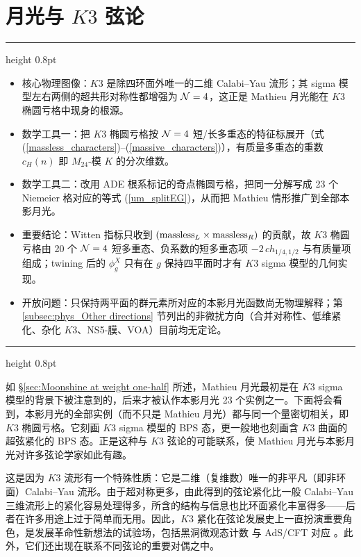 \documentclass[11pt,a4paper,fontset=windows]{ctexart}
\numberwithin{equation}{section}
\newenvironment{keytakeaways}
  {\par\medskip\noindent
   \begin{minipage}{\linewidth}
   \hrule height 0.8pt\smallskip
   \noindent{\bfseries 本节重点（Key Takeaways）}\par\smallskip
   \begin{itemize}[leftmargin=1.6em,itemsep=2pt,topsep=1pt,parsep=0pt,partopsep=0pt]}
  {\end{itemize}\smallskip\hrule height 0.8pt\end{minipage}%
   \par\medskip}
\newcommand{\eq}[1]{(\ref{#1})}
\begin{document}
\section{月光与 $K3$ 弦论}
\label{chap:moonshineK3}

\begin{keytakeaways}
  \item 核心物理图像：$K3$ 是除四环面外唯一的二维 Calabi--Yau 流形；其 sigma 模型左右两侧的超共形对称性都增强为 ${\cal N}=4$，这正是 Mathieu 月光能在 $K3$ 椭圆亏格中现身的根源。
  \item 数学工具一：把 $K3$ 椭圆亏格按 ${\cal N}=4$ 短/长多重态的特征标展开（式 \eq{massless_characters}--\eq{massive_characters}），有质量多重态的重数 $c_H(n)$ 即 $M_{24}$-模 $K$ 的分次维数。
  \item 数学工具二：改用 ADE 根系标记的奇点椭圆亏格，把同一分解写成 23 个 Niemeier 格对应的等式 \eq{um_splitEG}，从而把 Mathieu 情形推广到全部本影月光。
  \item 重要结论：Witten 指标只收到 $({\rm massless}_L\times{\rm massless}_R)$ 的贡献，故 $K3$ 椭圆亏格由 20 个 ${\cal N}=4$ 短多重态、负系数的短多重态项 $-2\,ch_{1/4,1/2}$ 与有质量项组成；twining 后的 $\phi_g^X$ 只有在 $g$ 保持四平面时才有 $K3$ sigma 模型的几何实现。
  \item 开放问题：只保持两平面的群元素所对应的本影月光函数尚无物理解释；第 \ref{subsec:phys_Other directions} 节列出的非微扰方向（合并对称性、低维紧化、杂化 $K3$、NS5-膜、VOA）目前均无定论。
\end{keytakeaways}

如 \S\ref{sec:Moonshine at weight one-half} 所述，Mathieu 月光最初是在 $K3$ sigma 模型的背景下被注意到的，后来才被认作本影月光 23 个实例之一。下面将会看到，本影月光的全部实例（而不只是 Mathieu 月光）都与同一个量密切相关，即 $K3$ 椭圆亏格。它刻画 $K3$ sigma 模型的 BPS 态，更一般地也刻画含 $K3$ 曲面的超弦紧化的 BPS 态。正是这种与 $K3$ 弦论的可能联系，使 Mathieu 月光与本影月光对许多弦论学家如此有趣。


这是因为 $K3$ 流形有一个特殊性质：它是二维（复维数）唯一的非平凡（即非环面）Calabi--Yau 流形。由于超对称更多，由此得到的弦论紧化比一般 Calabi--Yau 三维流形上的紧化容易处理得多，所含的结构与信息也比环面紧化丰富得多——后者在许多用途上过于简单而无用。因此，$K3$ 紧化在弦论发展史上一直扮演重要角色，是发展革命性新想法的试验场，包括黑洞微观态计数 \cite{StromingerPhys.Lett.B379:99-1041996} 与 AdS/CFT 对应 \cite{MaldacenaAdv.Theor.Math.Phys.2:231-2521998}。此外，它们还出现在联系不同弦论的重要对偶之中。
\end{document}
